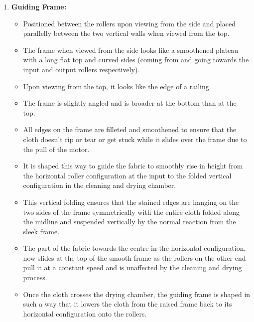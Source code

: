 \documentclass[table]{rapportCS}
\begin{document}
\begin{enumerate}[label=\arabic*.]
    \item \textbf{Guiding Frame:}
    \begin{itemize}[label=$\bullet$]
        \item Positioned between the rollers upon viewing from the side and placed parallelly between the two vertical walls when viewed from the top.
        \item The frame when viewed from the side looks like a smoothened plateau with a long flat top and curved sides (coming from and going towards the input and output rollers respectively).
        \item Upon viewing from the top, it looks like the edge of a railing.
        \item The frame is slightly angled and is broader at the bottom than at the top.
        \item All edges on the frame are filleted  and smoothened to ensure that the cloth doesn’t rip or tear or get stuck while it slides over the frame due to the pull of the motor.
        \item It is shaped this way to guide the fabric to smoothly rise in height from the horizontal roller configuration at the input to the folded vertical configuration in the cleaning and drying chamber.
        \item This vertical folding ensures that the stained edges are hanging on the two sides of the frame symmetrically with the entire cloth folded along the midline and suspended vertically by the normal reaction from the sleek frame.
        \item The part of the fabric towards the centre in the horizontal configuration, now slides at the top of the smooth frame as the rollers on the other end pull it at a constant speed and is unaffected by the cleaning and drying process.
        \item Once the cloth crosses the drying chamber, the guiding frame is shaped in such a way that it lowers the cloth from the raised frame back to its horizontal configuration onto the rollers.
    \end{itemize}


\end{enumerate}
\end{document}
